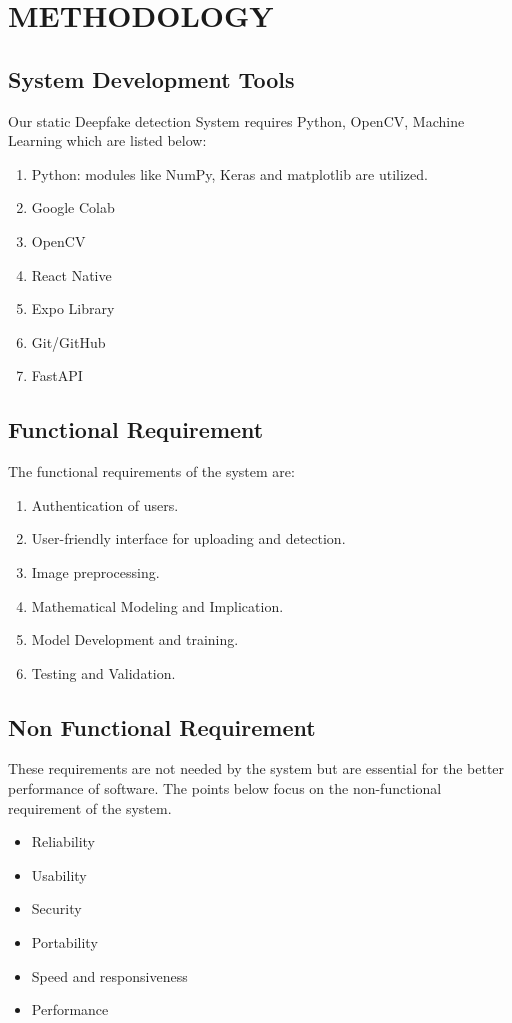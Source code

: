 

\section{METHODOLOGY}
\subsection{System Development Tools}
Our static Deepfake detection System requires Python, OpenCV,
Machine Learning which are listed below:
\begin{enumerate}
    \item Python: modules like NumPy, Keras and matplotlib are utilized.
    \item Google Colab
    \item OpenCV
    \item React Native
    \item Expo Library
    \item Git/GitHub
    \item FastAPI
\end{enumerate}

\subsection{Functional Requirement}
The functional requirements of the system are:
\begin{enumerate}
    \item Authentication of users.
    \item User-friendly interface for uploading and detection.
    \item Image preprocessing.
    \item Mathematical Modeling and Implication. 
    \item Model Development and training.
    \item Testing and Validation.

\end{enumerate}

\subsection{Non Functional Requirement}
\justify
These requirements are not needed by the system but are essential for the better
performance of software. The points below focus on the non-functional requirement of
the system.
\begin{itemize}
    \item Reliability
    \item   Usability
    \item   Security
    \item   Portability
    \item   Speed and responsiveness
    \item  Performance
\end{itemize}

